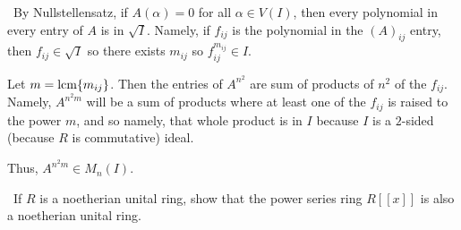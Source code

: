 \documentclass[12pt]{AlgebraQual}
\begin{document}
\begin{solution}$\,$
By Nullstellensatz, if $A(\alpha)=0$ for all $\alpha\in V(I)$, then every polynomial in every entry of $A$ is in $\sqrt{I}$. Namely, if $f_{ij}$ is the polynomial in the $(A)_{ij}$ entry, then $f_{ij}\in\sqrt{I}$ so there exists $m_{ij}$ so $f_{ij}^{m_{ij}}\in I$.

Let $m=\text{lcm}\{m_{ij}\}$. Then the entries of $A^{n^2}$ are sum of products of $n^2$ of the $f_{ij}$. Namely, $A^{n^2m}$ will be a sum of products where at least one of the $f_{ij}$ is raised to the power $m$, and so namely, that whole product is in $I$ because $I$ is a $2$-sided (because $R$ is commutative) ideal.

Thus, $A^{n^2m}\in M_n(I).$
\end{solution}
\newpage


\begin{problem} $\,$
If $R$ is a noetherian unital ring, show that the power series ring $R[[x]]$ is also a noetherian unital ring.
\end{problem}
\end{document}
